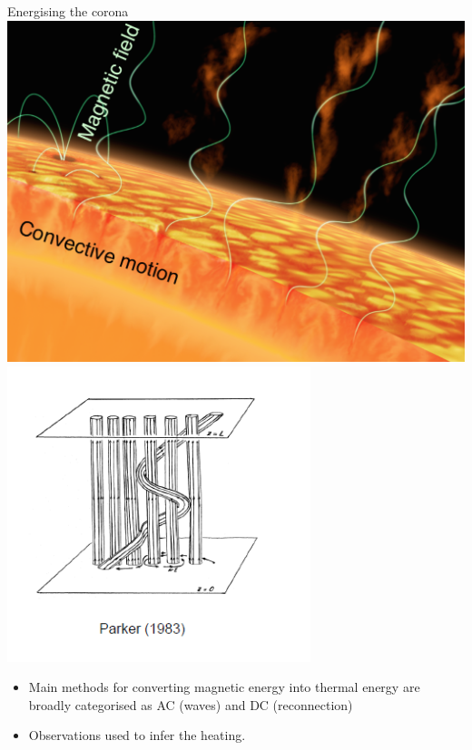 \documentclass[10pt,aspectratio=169,usenames,dvipsnames]{beamer}
\begin{document}
\begin{frame}{Energising the corona}
\centering
\includegraphics[width=0.45\linewidth]{2023Dundee/Figures/waveheating.png} 
\includegraphics[width=0.45\linewidth,clip=true,trim=0.0cm 1.0cm 0.0cm 0.0cm]{2023Dundee/Figures/reconnection.png}
\begin{itemize}
    \item Main methods for converting magnetic energy into thermal energy are broadly categorised as AC (waves) and DC (reconnection)
    \item Observations used to infer the heating.
\end{itemize}
\end{frame}
\end{document}
